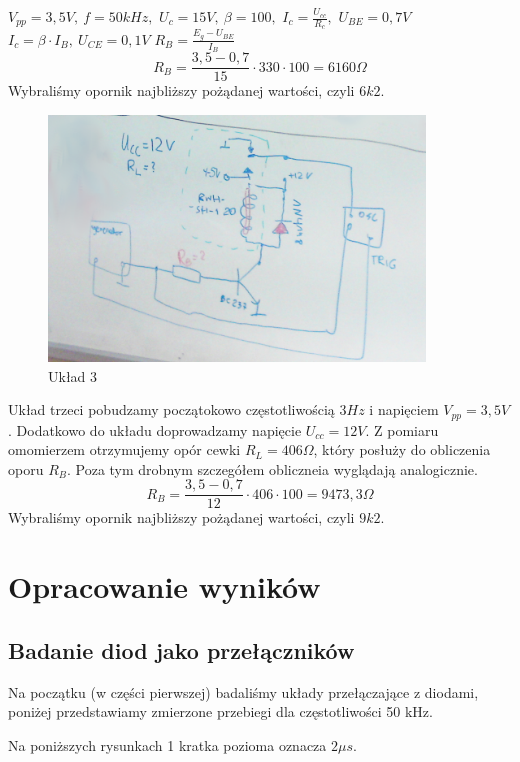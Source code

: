 \documentclass[a4paper,11pt]{article}
\begin{document}
\( V_{pp}=	3,5 V, \ f=50 kHz, \)
\( U_c= 15 V, \ \beta  =100, \) 
\( I_c= \frac {U_{cc}} {R_c}, \)
\( U_{BE} = 0,7 V \) \newline
\(  I_c=\beta \cdot I_B, \ U_{CE}=0,1 V \)
\( R_B= \frac {E_g -U_{BE}} {I_B}  \)
$$ R_B = \frac {3,5-0,7}{15} \cdot 330 \cdot 100 = 6160 \Omega $$
Wybraliśmy opornik najbliższy pożądanej wartości, czyli $6k2$.

\begin{figure} [H]
  \begin{center}
    \includegraphics[width = 10cm]{../Obrazki_i_tekst/obrobione/u3.png}
    \caption{Układ 3}
  \end{center}
\end{figure}
Układ trzeci pobudzamy początokowo częstotliwością $3 Hz$ i napięciem $V_{pp}=	3,5 V$. Dodatkowo do układu doprowadzamy napięcie $U_{cc} = 12 V $. Z pomiaru omomierzem otrzymujemy opór cewki $ R_L = 406 \Omega$, który posłuży do obliczenia oporu $R_B$. Poza tym drobnym szczegółem obliczneia wyglądają analogicznie.
$$ R_B = \frac {3,5-0,7}{12} \cdot 406 \cdot 100 = 9473,3 \Omega $$
Wybraliśmy opornik najbliższy pożądanej wartości, czyli $9k2$.





\section{Opracowanie wyników}


\subsection{Badanie diod jako przełączników}
Na początku (w części pierwszej) badaliśmy układy przełączające z diodami, poniżej przedstawiamy zmierzone przebiegi dla częstotliwości 50 kHz.

Na poniższych rysunkach 1 kratka pozioma oznacza \(2 \mu s\).
\end{document}
